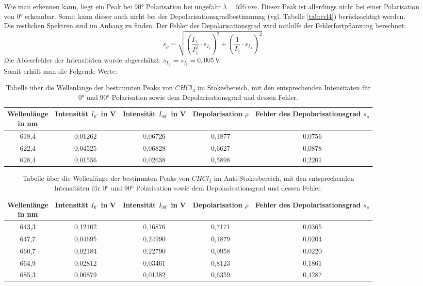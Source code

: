Wie man erkennen kann, liegt ein Peak bei 90° Polarisation bei ungefähr  $\lambda = 595\,nm$. Dieser Peak ist allerdings nicht
bei einer Polarisation von 0° erkennbar. Somit kann dieser auch nicht bei der Depolarisationsgradbestimmung (vgl. Tabelle \ref{tab:ccl4}) berücksichtigt werden.\\
Die restlichen Spektren sind im Anhang zu finden.
\newpage
Der Fehler des Depolarisationsgrad wird mithilfe der Fehlerfortpflanzung berechnet:
\begin{equation}
    s_{\rho} = \sqrt{\left(\frac{I_{\perp}}{I^2_{\parallel}} \cdot s_{I_{\parallel}} \right)^2 + \left(\frac{1}{I_{\parallel}} \cdot s_{I_{\perp}} \right)^2}
\end{equation}
Die Ablesefehler der Intensitäten wurde abgeschätzt: 
$s_{I_{\perp}} = s_{I_{\parallel}} = 0,005\,\text{V}$.\\
Somit erhält man die Folgende Werte:\\
\begin{table}[h]
  \centering
    \begin{tabular}{c||c|c|c|c}
    \makecell{Wellenlänge\\ in nm} & Intensität $I_{0^{\circ}}$ in V & Intensität $I_{90^{\circ}}$ in V & Depolarisation $\rho$ & \makecell{Fehler des \\ Depolarisationsgrad $s_{\rho}$} \\
    \hline
    618,4 & 0,01262 & 0,06726 & 0,1877 & 0,0756 \\
    622,4 & 0,04525 & 0,06828 & 0,6627 & 0,0878 \\
    628,4 & 0,01556 & 0,02638 & 0,5898 & 0,2201 \\
    \end{tabular}%
    \caption{Tabelle über die Wellenlänge der bestimmten Peaks von $CHCl_3$ im Stokesbereich, mit den entsprechenden Intensitäten für 0° und 90° Polarisation sowie dem Depolarisationsgrad und dessen Fehler. }
\end{table}

\begin{table}[h]
  \centering
    \begin{tabular}{c||c|c|c|c}
        \makecell{Wellenlänge\\ in nm} & Intensität $I_{0^{\circ}}$ in V & Intensität $I_{90^{\circ}}$ in V & Depolarisation $\rho$ & \makecell{Fehler des \\ Depolarisationsgrad $s_{\rho}$} \\
        \hline
      643,3 & 0,12102 & 0,16876 & 0,7171 & 0,0365 \\
      647,7 & 0,04695 & 0,24990 & 0,1879 & 0,0204 \\
      660,7 & 0,02184 & 0,22790 & 0,0958 & 0,0220 \\
      664,9 & 0,02812 & 0,03461 & 0,8123 & 0,1861 \\
      685,3 & 0,00879 & 0,01382 & 0,6359 & 0,4287 \\  
    \end{tabular}
    \caption{Tabelle über die Wellenlänge der bestimmten Peaks von $CHCl_3$ im Anti-Stokesbereich, mit den entsprechenden Intensitäten für 0° und 90° Polarisation sowie dem Depolarisationsgrad und dessen Fehler. }
\end{table}

